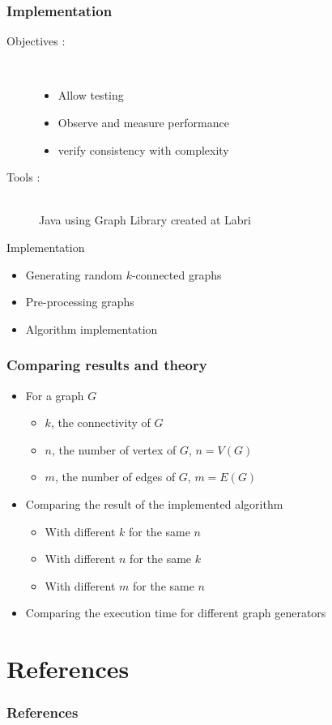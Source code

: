 \documentclass[xcolor=dvipsnames]{beamer}
\begin{document}
\begin{frame}
\frametitle{Implementation}
\begin{description}
	\item [Objectives :] \hfill \\
	\begin{itemize}
		 \item Allow testing 
		\item Observe and measure performance
        \item verify consistency with complexity
     \end{itemize}

 \item[Tools :] \hfill \\
		Java using Graph Library created at Labri
  \end{description}
\end{frame}

\begin{frame}{Implementation}
  \begin{itemize}
  \item Generating random $k$-connected graphs
  \item Pre-processing graphs
  \item Algorithm implementation
  \end{itemize}
\end{frame}

\begin{frame}
  \frametitle{Comparing results and theory}
  \begin{itemize}
  \item For a graph $G$
    \begin{itemize}
    \item $k$, the connectivity of $G$
    \item $n$, the number of vertex of $G$, $n = V(G)$
    \item $m$, the number of edges of $G$, $m = E(G)$
    \end{itemize}
  \item Comparing the result of the implemented algorithm
    \begin{itemize}
    \item With different $k$ for the same $n$
    \item With different $n$ for the same $k$
    \item With different $m$ for the same $n$
    \end{itemize}
  \item Comparing the execution time for different graph generators
  \end{itemize}
\end{frame}




\section*{References}
\begin{frame}[allowframebreaks]
  \frametitle{References}
  

  
\end{frame}
\end{document}
